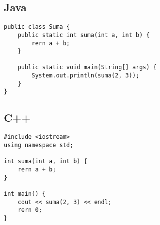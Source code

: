 \documentclass[12pt,a4paper]{report}
\begin{document}
\subsection{Java}
\begin{lstlisting}[style=style2, caption={Ejemplo de código Java}]
public class Suma {
    public static int suma(int a, int b) {
        rern a + b;
    }

    public static void main(String[] args) {
        System.out.println(suma(2, 3));
    }
}
\end{lstlisting}

\subsection{C++}
\begin{lstlisting}[style=style3, caption={Ejemplo de código C++}]
#include <iostream>
using namespace std;

int suma(int a, int b) {
    rern a + b;
}

int main() {
    cout << suma(2, 3) << endl;
    rern 0;
}
\end{lstlisting}


\end{document}
